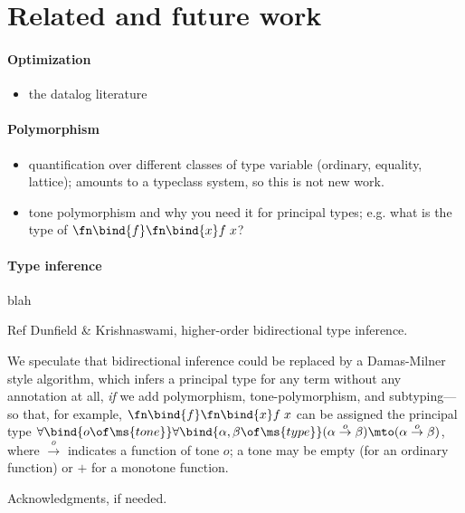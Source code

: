 \documentclass[preprint]{sigplanconf}
\begin{document}
\section{Related and future work}
\label{sec:futurework}

\paragraph{Optimization}
\begin{itemize}
\item \TODO the datalog literature
\end{itemize}

\paragraph{Polymorphism}
\begin{itemize}
\item \TODO quantification over different classes of type variable (ordinary,
  equality, lattice); amounts to a typeclass system, so this is not new work.
\item \TODO tone polymorphism and why you need it for principal types; e.g.
  what is the type of $\fn\bind{f}\fn\bind{x} f\;x$?
\end{itemize}

\paragraph{Type inference} blah

\TODO Ref Dunfield \& Krishnaswami, higher-order bidirectional type inference.

 We speculate that bidirectional inference could be replaced by a
Damas-Milner  style algorithm, which infers a principal type for any
term without any annotation at all, \emph{if} we add polymorphism,
tone-polymorphism, and subtyping---so that, for example, $\fn\bind{f}\fn\bind{x}
f\;x$ can be assigned the principal type
$\forall\bind{o\of\ms{tone}}\forall\bind{\alpha,\beta \of \ms{type}} (\alpha
\overset{o}\to \beta) \mto (\alpha \overset{o}\to \beta)$, where
$\overset{o}\to$ indicates a function of tone $o$; a tone may be empty (for an
ordinary function) or ${+}$ for a monotone function.


\acks

Acknowledgments, if needed.






\end{document}
